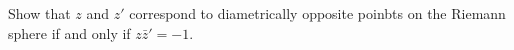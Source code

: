 Show that $z$ and $z'$ correspond to diametrically opposite poinbts on the Riemann sphere if and only
if $z\bar{z}'=-1$.\\

\begin{solution}\renewcommand{\qedsymbol}{}\ \\

    

\end{solution}